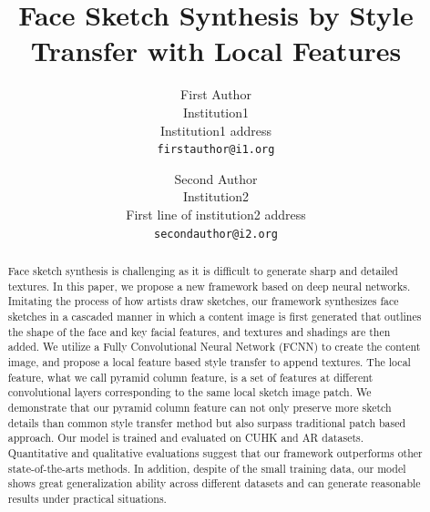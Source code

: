 \documentclass[10pt,twocolumn,letterpaper]{article}
\begin{document}
\title{Face Sketch Synthesis by Style Transfer with Local Features}

\author{First Author\\
Institution1\\
Institution1 address\\
{\tt\small firstauthor@i1.org}
\and
Second Author\\
Institution2\\
First line of institution2 address\\
{\tt\small secondauthor@i2.org}
}

\maketitle


\begin{abstract}

Face sketch synthesis is challenging as it is difficult to generate sharp and detailed textures. In this paper, we propose a new framework based on deep neural networks. Imitating the process of how artists draw sketches, our framework synthesizes face sketches in a cascaded manner in which a content image is first generated that outlines the shape of the face and key facial features, and textures and shadings are then added. We utilize a Fully Convolutional Neural Network (FCNN) to create the content image, and propose a local feature based style transfer to append textures. The local feature, what we call pyramid column feature, is a set of features at different convolutional layers corresponding to the same local sketch image patch. We demonstrate that our pyramid column feature can not only preserve more sketch details than common style transfer method but also surpass traditional patch based approach. Our model is trained and evaluated on CUHK and AR datasets. Quantitative and qualitative evaluations suggest that our framework outperforms other state-of-the-arts methods. In addition, despite of the small training data, our model shows great generalization ability across different datasets and can generate reasonable results under practical situations.

\end{abstract}
\end{document}

